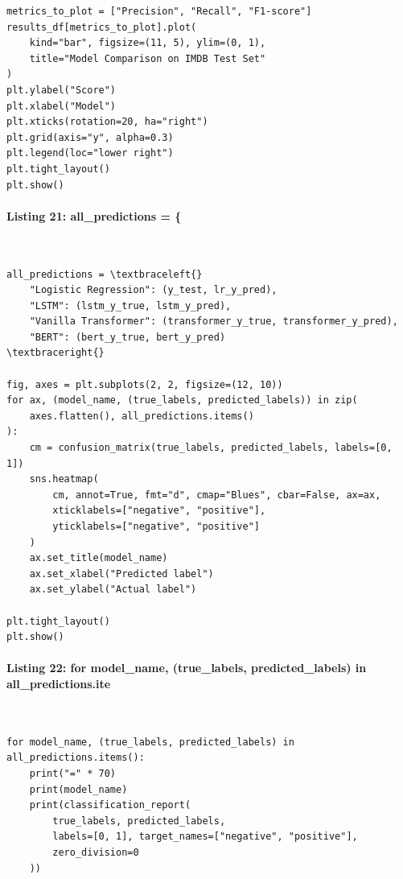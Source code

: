 \documentclass[12pt,a4paper,oneside]{report}
\begin{document}
\begin{Verbatim}[commandchars=\\\{\},breaklines=true,breakanywhere=true,fontsize=\scriptsize,frame=leftline,framesep=2mm,rulecolor=\color{gray}]
metrics_to_plot = ["Precision", "Recall", "F1-score"]
results_df[metrics_to_plot].plot(
    kind="bar", figsize=(11, 5), ylim=(0, 1),
    title="Model Comparison on IMDB Test Set"
)
plt.ylabel("Score")
plt.xlabel("Model")
plt.xticks(rotation=20, ha="right")
plt.grid(axis="y", alpha=0.3)
plt.legend(loc="lower right")
plt.tight_layout()
plt.show()
\end{Verbatim}
\paragraph{Listing 21: all\_predictions = \{}\mbox{}\\[-1ex]
\begin{Verbatim}[commandchars=\\\{\},breaklines=true,breakanywhere=true,fontsize=\scriptsize,frame=leftline,framesep=2mm,rulecolor=\color{gray}]
all_predictions = \textbraceleft{}
    "Logistic Regression": (y_test, lr_y_pred),
    "LSTM": (lstm_y_true, lstm_y_pred),
    "Vanilla Transformer": (transformer_y_true, transformer_y_pred),
    "BERT": (bert_y_true, bert_y_pred)
\textbraceright{}

fig, axes = plt.subplots(2, 2, figsize=(12, 10))
for ax, (model_name, (true_labels, predicted_labels)) in zip(
    axes.flatten(), all_predictions.items()
):
    cm = confusion_matrix(true_labels, predicted_labels, labels=[0, 1])
    sns.heatmap(
        cm, annot=True, fmt="d", cmap="Blues", cbar=False, ax=ax,
        xticklabels=["negative", "positive"],
        yticklabels=["negative", "positive"]
    )
    ax.set_title(model_name)
    ax.set_xlabel("Predicted label")
    ax.set_ylabel("Actual label")

plt.tight_layout()
plt.show()
\end{Verbatim}
\paragraph{Listing 22: for model\_name, (true\_labels, predicted\_labels) in all\_predictions.ite}\mbox{}\\[-1ex]
\begin{Verbatim}[commandchars=\\\{\},breaklines=true,breakanywhere=true,fontsize=\scriptsize,frame=leftline,framesep=2mm,rulecolor=\color{gray}]
for model_name, (true_labels, predicted_labels) in all_predictions.items():
    print("=" * 70)
    print(model_name)
    print(classification_report(
        true_labels, predicted_labels,
        labels=[0, 1], target_names=["negative", "positive"],
        zero_division=0
    ))
\end{Verbatim}
\end{document}

